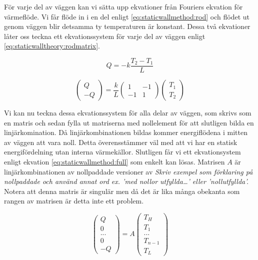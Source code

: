 För varje del av väggen kan vi sätta upp ekvationer från Fouriers ekvation
för värmeflöde. Vi får flöde in i en del enligt \eqref{eq:staticwallmethod:rod} och
flödet ut genom väggen blir detsamma ty temperaturen är konstant. Dessa två
ekvationer låter oss teckna ett ekvationssystem för varje del av väggen
enligt \eqref{eq:staticwalltheory:rodmatrix}. \cite{lewis04}

\begin{equation}
\label{eq:staticwallmethod:rod}
Q = -k\frac{T_{2}-T_{1}}{L}
\end{equation}


\begin{equation}
\label{eq:staticwalltheory:rodmatrix}
\begin{pmatrix}
Q \\
-Q
\end{pmatrix} = 
\frac{k}{L}\begin{pmatrix}
1 & -1 \\
-1 & 1
\end{pmatrix}
\begin{pmatrix}
T_1 \\
T_2
\end{pmatrix}
\end{equation}

\noindent
Vi kan nu teckna dessa ekvationssystem för alla delar av väggen, som skrivs som 
en matris och sedan fylla ut matriserna med nollelement för att slutligen bilda 
en linjärkomination.
Då linjärkombinationen bildas kommer energiflödena i mitten av väggen att
vara noll. Detta överensstämmer väl med att vi har en statisk energifördelning
utan interna värmekällor.
Slutligen får vi ett ekvationsystem enligt ekvation
\eqref{eq:staticwallmethod:full} som enkelt kan lösas. Matrisen $A$ är linjärkombinationen av nollpaddade versioner av \emph{\color{red} Skriv exempel som förklaring på nollpaddade och använd annat ord ex. 'med nollor utfyllda…' eller 'nollutfyllda'.}
Notera att denna matris är singulär men då det är lika många
obekanta som rangen av matrisen är detta inte ett problem.

\begin{equation}
\label{eq:staticwallmethod:full}
\begin{pmatrix}
Q\\0\\...\\0\\-Q
\end{pmatrix} = A
\begin{pmatrix}
T_H\\T_1\\...\\T_{n-1}\\T_L
\end{pmatrix}
\end{equation}
